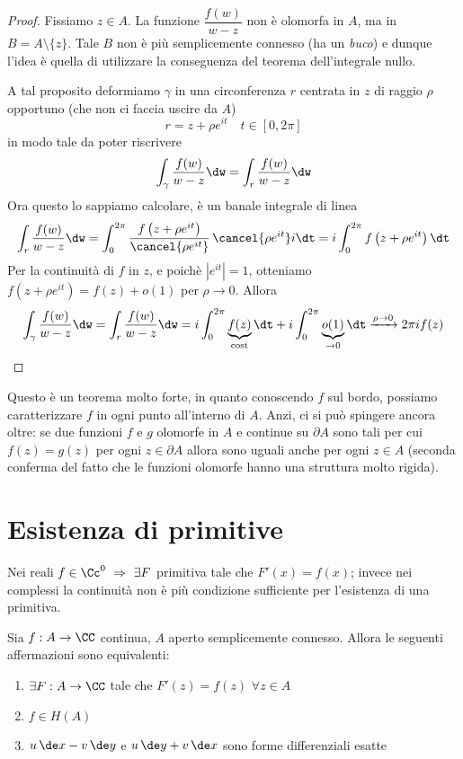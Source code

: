 \begin{proof}
Fissiamo $z\in A$. La funzione $\dfrac{f(w)}{w - z}$ non è olomorfa in $A$, ma in $B=A\setminus\{z\}$. Tale $B$ non è più semplicemente connesso (ha un \textit{buco}) e dunque l'idea è quella di utilizzare la conseguenza del teorema dell'integrale nullo.

A tal proposito deformiamo $\gamma$ in una circonferenza $r$ centrata in $z$ di raggio $\rho$ opportuno (che non ci faccia uscire da $A$)
$$
r=z+\rho e^{it} \quad t\in[0,2\pi]
$$
in modo tale da poter riscrivere
\begin{equation*}
\int_{\gamma}\frac{f(w)}{w - z} \dw=\int_{r}\frac{f(w)}{w - z} \dw
\end{equation*}
Ora questo lo sappiamo calcolare, è un banale integrale di linea
\begin{equation*}
\int_{r}\frac{f(w)}{w - z} \dw = \int^{2\pi}_{0}\frac{f\left(z + \rho e^{it}\right)}{\cancel{\rho e^{it}}}\,\cancel{\rho e^{it}}i \dt = i\int^{2\pi}_{0} f\left(z + \rho e^{it}\right) \dt
\end{equation*}
Per la continuità di $f$ in $z$, e poichè $\left|e^{it}\right|=1$, otteniamo $f\left(z + \rho e^{it}\right)=f(z)+o(1)$ per $\rho\to 0$. Allora
\begin{equation*}
\int_{\gamma}\frac{f(w)}{w - z} \dw=\int_{r}\frac{f(w)}{w - z} \dw=i\int_{0}^{2\pi} \underbrace{f(z)}_{\text{cost}}\dt+i\int_0^{2\pi} \underbrace{o(1)}_{\to 0}\dt \xrightarrow[]{\rho\to 0} 2\pi i f(z)
\end{equation*}
\end{proof}

Questo è un teorema molto forte, in quanto conoscendo $f$ sul bordo, possiamo caratterizzare $f$ in ogni punto all'interno di $A$. Anzi, ci si può spingere ancora oltre: se due funzioni $f$ e $g$ olomorfe in $A$ e continue su $\partial A$ sono tali per cui $f(z)=g(z)$ per ogni $z\in\partial A$ allora sono uguali anche per ogni $z\in A$ (seconda conferma del fatto che le funzioni olomorfe hanno una struttura molto rigida).

\section{Esistenza di primitive}

Nei reali $f\in\Cc^0\ \Rightarrow\ \exists F$ primitiva tale che $F'(x)=f(x)$; invece nei complessi la continuità non è più condizione sufficiente per l'esistenza di una primitiva.
\begin{thm}
Sia $f:A\to\CC$ continua, $A$ aperto semplicemente connesso. Allora le seguenti affermazioni sono equivalenti:
\begin{enumerate}
    \item $\exists F:A\to\CC$ tale che $F'(z)=f(z)$ $\forall z\in A$
    \item $f\in H(A)$
    \item $u\,\de x-v\,\de y$ e $u\,\de y+v\,\de x$ sono forme differenziali esatte
\end{enumerate}
\end{thm}


